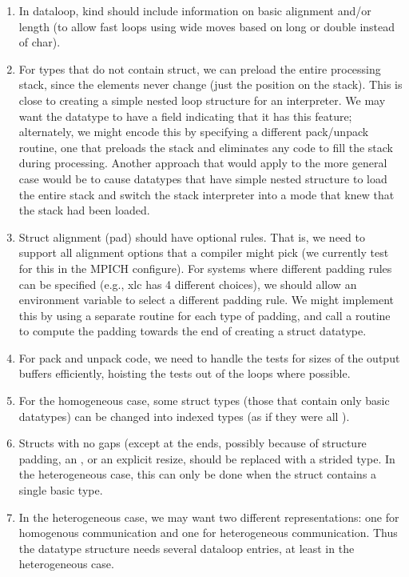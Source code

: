 \documentclass{article}
\begin{document}
\begin{enumerate}
\item In dataloop, kind should include information on basic alignment
   and/or length (to allow fast loops using wide moves based on long
   or double instead of char).

\item For types that do not contain struct, we can preload the entire
   processing stack, since the elements never change (just the
   position on the stack).  This is close to creating a simple nested
   loop structure for an interpreter.  We may want the datatype to
   have a field indicating that it has this feature; alternately, we
   might encode this by specifying a different pack/unpack routine,
   one that preloads the stack and eliminates any code to fill the
   stack during processing.  Another approach that would apply to the
   more general case would be to cause datatypes that have simple
   nested structure to load the entire stack and switch the stack
   interpreter into a mode that knew that the stack had been loaded.

\item Struct alignment (pad) should have optional rules.  That is, we
   need to support all alignment options that a compiler might pick
   (we currently test for this in the MPICH configure).  For systems
   where different padding rules can be specified (e.g., xlc has 4
   different choices), we should allow an environment variable to
   select a different padding rule.  We might implement this by using
   a separate routine for each type of padding, and call a routine to
   compute the padding towards the end of creating a struct datatype.

\item For pack and unpack code, we need to handle the tests for sizes of
    the output buffers efficiently, hoisting the tests out of the
    loops where possible.  

\item For the homogeneous case, some struct types (those that contain
    only basic datatypes) can be changed into indexed types (as if
    they were all ).

\item Structs with no gaps (except at the ends, possibly because of 
    structure padding, an , or an explicit resize,
    should be replaced with a strided type.  In the heterogeneous
    case, this can only be done when the struct contains a single
    basic type.

\item In the heterogeneous case, we may want two different
    representations: one for homogenous communication and one for
    heterogeneous communication.  Thus the datatype structure needs
    several dataloop entries, at least in the heterogeneous case.

\end{enumerate}
\end{document}
